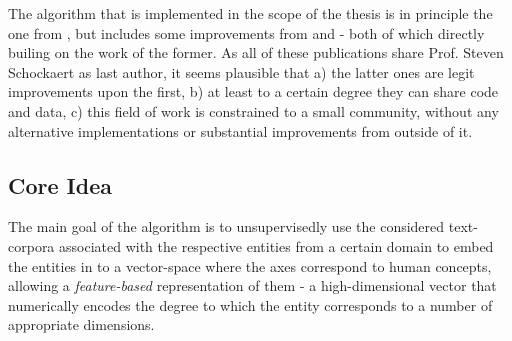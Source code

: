 The algorithm that is implemented in the scope of the thesis is in principle the one from \textcite{Derrac2015}, but includes some improvements from \textcite{Ager2018} and \textcite{Alshaikh2020} - both of which directly builing on the work of the former. As all of these publications share Prof. Steven Schockaert as last author, it seems plausible that a) the latter ones are legit improvements upon the first, b) at least to a certain degree they can share code and data, c) this field of work is constrained to a small community, without any alternative implementations or substantial improvements from outside of it.

\subsection{Core Idea}

The main goal of the algorithm is to unsupervisedly use the considered text-corpora associated with the respective entities from a certain domain %
to embed the entities in to a vector-space where the axes correspond to human concepts, %
allowing a \textit{feature-based} representation of them - a high-dimensional vector that numerically encodes the degree %
to which the entity corresponds to a number of appropriate dimensions. %
\newline

